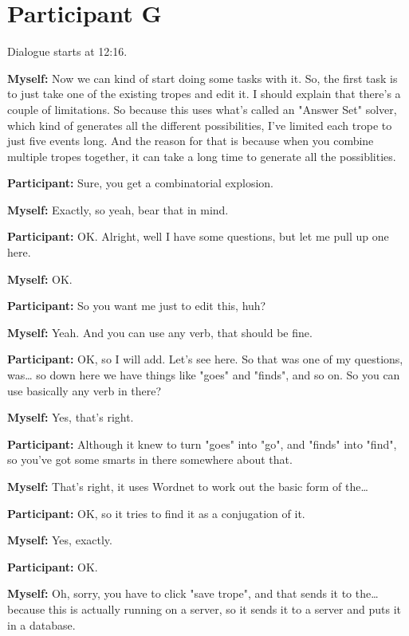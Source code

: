 \documentclass[11pt]{report}
\newcommand{\llabel}[1]{\hypertarget{llineno:#1}{\linelabel{#1}}}
\begin{document}
\section{Participant G}
Dialogue starts at 12:16.

\begin{linenumbers}
\textbf{Myself:} Now we can kind of start doing some tasks with it. So, the first task is to just take one of the existing tropes and edit it. I should explain that there's a couple of limitations. So because this uses what's called an "Answer Set" solver, which kind of generates all the different possibilities, I've limited each trope to just five events long. And the reason for that is because when you combine multiple tropes together, it can take a long time to generate all the possiblities.

\textbf{Participant:} Sure, you get a combinatorial explosion.

\textbf{Myself:} Exactly, so yeah, bear that in mind.

\textbf{Participant:} OK. Alright, well I have some questions, but let me pull up one here.

\textbf{Myself:} OK.

\textbf{Participant:} So you want me just to edit this, huh?

\textbf{Myself:} Yeah. And you can use any verb, that should be fine.

\textbf{Participant:} OK, so I will add. Let's see here. So that was one of my
questions, was\ldots{} so down here we have things like "goes" and "finds", and
so on. So you can use basically any verb in there?\llabel{lne:syntax2g}

\textbf{Myself:} Yes, that's right.

\textbf{Participant:} Although it knew to turn "goes" into "go", and "finds" into "find", so you've got some smarts in there somewhere about that.

\textbf{Myself:} That's right, it uses Wordnet to work out the basic form of the\ldots{}

\textbf{Participant:} OK, so it tries to find it as a conjugation of it.

\textbf{Myself:} Yes, exactly.

\textbf{Participant:} OK.

\textbf{Myself:} Oh, sorry, you have to click "save trope", and that sends it to the\ldots{} because this is actually running on a server, so it sends it to a server and puts it in a database.


\end{linenumbers}
\end{document}
